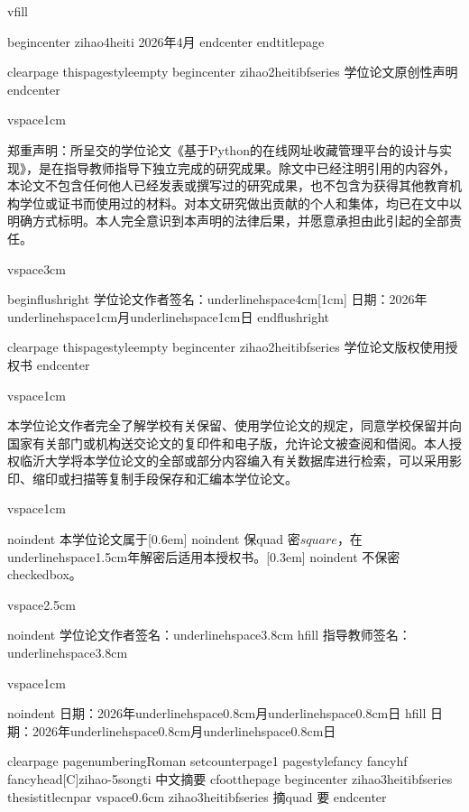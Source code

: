     vfill

    begin{center}
        {zihao{4}heiti 2026年4月}
    end{center}
end{titlepage}

clearpage
thispagestyle{empty}
begin{center}
    {zihao{2}heitibfseries 学位论文原创性声明}
end{center}

vspace{1cm}

郑重声明：所呈交的学位论文《基于Python的在线网址收藏管理平台的设计与实现》，是在指导教师指导下独立完成的研究成果。除文中已经注明引用的内容外，本论文不包含任何他人已经发表或撰写过的研究成果，也不包含为获得其他教育机构学位或证书而使用过的材料。对本文研究做出贡献的个人和集体，均已在文中以明确方式标明。本人完全意识到本声明的法律后果，并愿意承担由此引起的全部责任。

vspace{3cm}

begin{flushright}
学位论文作者签名：underline{hspace{4cm}}[1cm]
日期：2026年underline{hspace{1cm}}月underline{hspace{1cm}}日
end{flushright}

clearpage
thispagestyle{empty}
begin{center}
    {zihao{2}heitibfseries 学位论文版权使用授权书}
end{center}

vspace{1cm}

本学位论文作者完全了解学校有关保留、使用学位论文的规定，同意学校保留并向国家有关部门或机构送交论文的复印件和电子版，允许论文被查阅和借阅。本人授权临沂大学将本学位论文的全部或部分内容编入有关数据库进行检索，可以采用影印、缩印或扫描等复制手段保存和汇编本学位论文。

vspace{1cm}

noindent 本学位论文属于[0.6em]
noindent 保quad 密$square$，在underline{hspace{1.5cm}}年解密后适用本授权书。[0.3em]
noindent 不保密checkedbox。

vspace{2.5cm}

noindent 学位论文作者签名：underline{hspace{3.8cm}} hfill 指导教师签名：underline{hspace{3.8cm}}

vspace{1cm}

noindent 日期：2026年underline{hspace{0.8cm}}月underline{hspace{0.8cm}}日 hfill 日期：2026年underline{hspace{0.8cm}}月underline{hspace{0.8cm}}日

clearpage
pagenumbering{Roman}
setcounter{page}{1}
pagestyle{fancy}
fancyhf{}
fancyhead[C]{zihao{-5}songti 中文摘要}
cfoot{thepage}
begin{center}
    {zihao{3}heitibfseries thesistitlecnpar}
    vspace{0.6cm}
    {zihao{3}heitibfseries 摘quad 要}
end{center}

